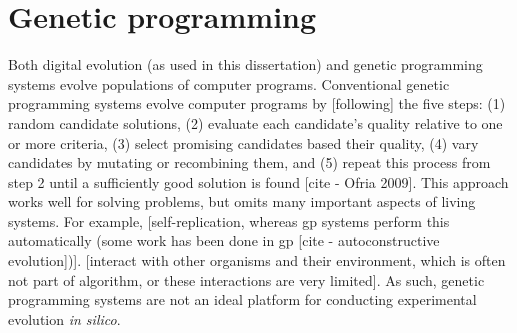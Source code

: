 \section{Genetic programming}


Both digital evolution (as used in this dissertation) and genetic programming systems evolve populations of computer programs.
Conventional genetic programming systems evolve computer programs by [following] the five steps: 
(1) random candidate solutions,
(2) evaluate each candidate's quality relative to one or more criteria,
(3) select promising candidates based their quality,
(4) vary candidates by mutating or recombining them, and
(5) repeat this process from step 2 until a sufficiently good solution is found [cite - Ofria 2009].
This approach works well for solving problems, but omits many important aspects of living systems.
For example,
[self-replication, whereas gp systems perform this automatically (some work has been done in gp [cite - autoconstructive evolution])].
[interact with other organisms and their environment, which is often not part of algorithm, or these interactions are very limited].
As such, genetic programming systems are not an ideal platform for conducting experimental evolution \textit{in silico}. 










